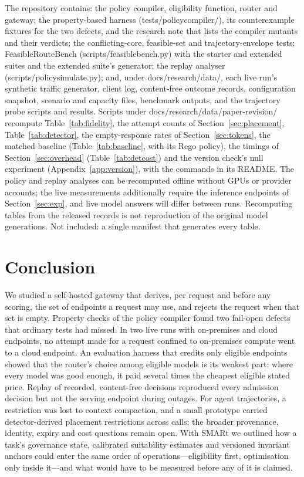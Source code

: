 \documentclass[11pt]{article}
\newcommand{\ubreak}{\textunderscore\allowbreak}
\newcommand{\code}[1]{{\ttfamily\let\_\ubreak #1}}
\begin{document}
The repository contains: the policy compiler, eligibility function, router and gateway; the
property-based harness (\code{tests/policy\_compiler/}), its counterexample fixtures for the two
defects, and the research note that lists the compiler mutants and their verdicts; the
conflicting-core, feasible-set and trajectory-envelope tests; FeasibleRouteBench
(\code{scripts/feasible\_bench.py}) with the starter and extended suites and the extended
suite's generator; the replay analyser (\code{scripts/policy\_simulate.py}); and, under
\code{docs/research/data/}, each live run's synthetic traffic generator, client log,
content-free outcome records, configuration snapshot, scenario and capacity files, benchmark
outputs, and the trajectory probe scripts and results. Scripts under
\code{docs/research/data/paper-revision/} recompute Table~\ref{tab:fidelity}, the attempt counts
of Section~\ref{sec:placement}, Table~\ref{tab:detector}, the empty-response rates of
Section~\ref{sec:tokens}, the matched baseline (Table~\ref{tab:baseline}, with its Rego
policy), the timings of Section~\ref{sec:overhead} (Table~\ref{tab:detcost}) and the version
check's null experiment (Appendix~\ref{app:version}), with the commands in its README. The policy and replay analyses can be recomputed offline without GPUs or provider
accounts; the live measurements additionally require the inference endpoints of
Section~\ref{sec:exp}, and live model answers will differ between runs. Recomputing tables from
the released records is not reproduction of the original model generations. Not included: a single manifest that generates every table.

\section{Conclusion}

We studied a self-hosted gateway that derives, per request and before any scoring, the set of
endpoints a request may use, and rejects the request when that set is empty. Property checks of
the policy compiler found two fail-open defects that ordinary tests had missed. In two live runs
with on-premises and cloud endpoints, no attempt made for a request confined to on-premises
compute went to a cloud endpoint. An evaluation harness that credits only eligible endpoints
showed that the router's choice among eligible models is its weakest part: where every model was
good enough, it paid several times the cheapest eligible stated price. Replay of recorded,
content-free decisions reproduced every admission decision but not the serving endpoint during
outages. For agent trajectories, a restriction was lost to context compaction, and a small
prototype carried detector-derived placement restrictions across calls; the broader provenance,
identity, expiry and cost questions remain open. With SMARt we outlined how a task's governance
state, calibrated suitability estimates and versioned invariant anchors could enter the same
order of operations---eligibility first, optimisation only inside it---and what would have to
be measured before any of it is claimed.
\end{document}
